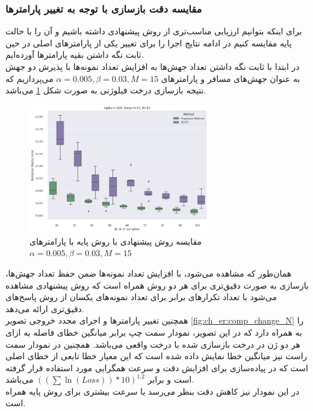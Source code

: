 \subsubsection{مقایسه دقت بازسازی با توجه به تغییر پارامترها}
برای اینکه بتوانیم ارزیابی مناسب‌تری از روش پیشنهادی داشته باشیم و آن را با حالت پایه مقایسه کنیم در ادامه نتایج اجرا را برای تغییر یکی از پارامترهای اصلی در حین ثابت نگه داشتن بقیه پارامترها آورده‌ایم.\\
در ابتدا با ثابت نگه داشتن تعداد جهش‌ها به افزایش تعداد نمونه‌ها با پذیرش دو جهش به عنوان جهش‌های مسافر و پارامترهای
$\alpha=0.005, \beta=0.03, M=15$
می‌پردازیم که نتیجه بازسازی درخت فیلوژنی به صورت شکل \ref{fig:sy_n_err_mean} می‌باشد.
\begin{figure}[!ht]
	\centering
	\includegraphics[width=0.7\textwidth]{img/chaps/er/comp_pm_scite}
	\caption{‌مقایسه روش پیشنهادی با روش پایه  با پارامترهای $\alpha=0.005, \beta=0.03, M=15$}
	\label{fig:sy_n_err_mean}
\end{figure}
همان‌طور که مشاهده می‌شود، با افزایش تعداد نمونه‌ها ضمن حفظ تعداد جهش‌ها، بازسازی به صورت ‌دقیق‌تری برای هر دو روش همراه است که روش پیشنهادی مشاهده می‌شود با تعداد تکرارهای برابر برای تعداد نمونه‌های یکسان از روش  پاسخ‌های دقیق‌تری ارائه می‌دهد.\\
همچنین تغییر پارامترها و اجرای مجدد خروجی تصویر \ref{fig:ch_er:comp_change_N} را به همراه دارد که در این تصویر، نمودار سمت چپ برابر میانگین خطای فاصله به ازای هر دو ژن در درخت بازسازی شده با درخت واقعی می‌باشد. همچنین در نمودار سمت راست نیز میانگین خطا نمایش داده شده است که این معیار خطا تابعی از خطای اصلی است که در پیاده‌سازی برای افزایش دقت و سرعت همگرایی مورد استفاده قرار گرفته است و برابر 
$\left(\left( \sum\ln(Loss)\right)*10\right)^{1.2}$ می‌باشد.
\\ در این نمودار نیز کاهش دقت بنظر می‌رسد با سرعت بیشتری برای روش پایه همراه است.
